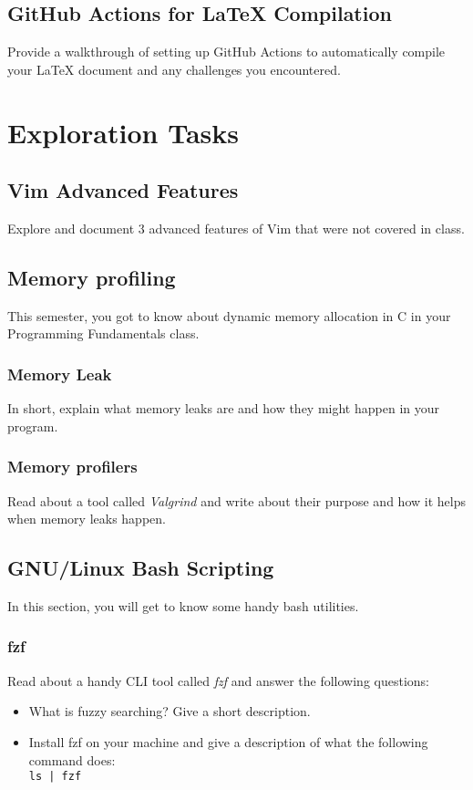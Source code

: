 \documentclass[12pt]{article}
\begin{document}
\subsection{GitHub Actions for LaTeX Compilation}
Provide a walkthrough of setting up GitHub Actions to automatically compile your LaTeX document and any challenges you encountered.


\section{Exploration Tasks}
\subsection{Vim Advanced Features}
Explore and document 3 advanced features of Vim that were not covered in class.

\subsection{Memory profiling}
This semester, you got to know about dynamic memory allocation in C in your Programming Fundamentals class.

\subsubsection{Memory Leak}
In short, explain what memory leaks are and how they might happen in your program.

\subsubsection{Memory profilers}
Read about a tool called \textit{Valgrind} and write about their purpose and how it helps when memory leaks happen.

\subsection{GNU/Linux Bash Scripting}
In this section, you will get to know some handy bash utilities.

\subsubsection{fzf}
Read about a handy CLI tool called \textit{fzf} and answer the following questions:

\begin{itemize}
    \item What is fuzzy searching? Give a short description.
    \item Install fzf on your machine and give a description of what the following command does:\\
        \texttt{ls | fzf}
\end{itemize}
\end{document}
